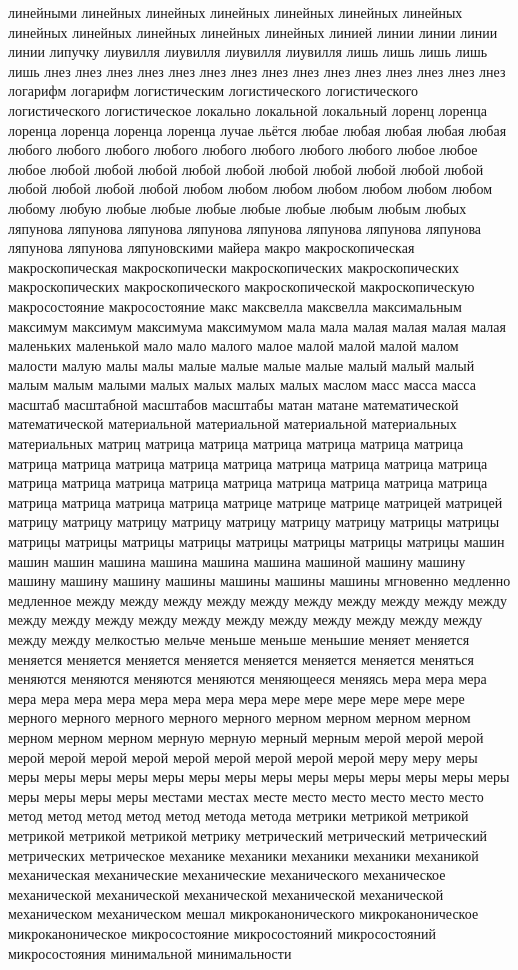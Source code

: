 линейными линейных линейных линейных линейных линейных линейных линейных линейных линейных линейных линейных линией линии линии линии линии липучку лиувилля лиувилля лиувилля лиувилля лишь лишь лишь лишь лишь лнез лнез лнез лнез лнез лнез лнез лнез лнез лнез лнез лнез лнез лнез лнез логарифм логарифм логистическим логистического логистического логистического логистическое локально локальной локальный лоренц лоренца лоренца лоренца лоренца лоренца лучае льётся любае любая любая любая любая любого любого любого любого любого любого любого любого любое любое любое любой любой любой любой любой любой любой любой любой любой любой любой любой любой любом любом любом любом любом любом любом любому любую любые любые любые любые любые любым любым любых ляпунова ляпунова ляпунова ляпунова ляпунова ляпунова ляпунова ляпунова ляпунова ляпунова ляпуновскими майера макро макроскопическая макроскопическая макроскопически макроскопических макроскопических макроскопических макроскопического макроскопической макроскопическую макросостояние макросостояние макс максвелла максвелла максимальным максимум максимум максимума максимумом мала мала малая малая малая малая маленьких маленькой мало мало малого малое малой малой малой малом малости малую малы малы малые малые малые малые малый малый малый малым малым малыми малых малых малых малых маслом масс масса масса масштаб масштабной масштабов масштабы матан матане математической математической материальной материальной материальной материальных материальных матриц матрица матрица матрица матрица матрица матрица матрица матрица матрица матрица матрица матрица матрица матрица матрица матрица матрица матрица матрица матрица матрица матрица матрица матрица матрица матрица матрица матрица матрице матрице матрице матрицей матрицей матрицу матрицу матрицу матрицу матрицу матрицу матрицу матрицы матрицы матрицы матрицы матрицы матрицы матрицы матрицы матрицы матрицы машин машин машин машина машина машина машина машиной машину машину машину машину машину машины машины машины машины мгновенно медленно медленное между между между между между между между между между между между между между между между между между между между между между между между мелкостью мельче меньше меньше меньшие меняет меняется меняется меняется меняется меняется меняется меняется меняется меняться меняются меняются меняются меняются меняющееся меняясь мера мера мера мера мера мера мера мера мера мера мера мере мере мере мере мере мере мерного мерного мерного мерного мерного мерном мерном мерном мерном мерном мерном мерном мерную мерную мерный мерным мерой мерой мерой мерой мерой мерой мерой мерой мерой мерой мерой мерой меру меру меры меры меры меры меры меры меры меры меры меры меры меры меры меры меры меры меры меры меры местами местах месте место место место место место метод метод метод метод метод метода метода метрики метрикой метрикой метрикой метрикой метрикой метрику метрический метрический метрический метрических метрическое механике механики механики механики механикой механическая механические механические механического механическое механической механической механической механической механической механическом механическом мешал микроканонического микроканоническое микроканоническое микросостояние микросостояний микросостояний микросостояния минимальной минимальности 
